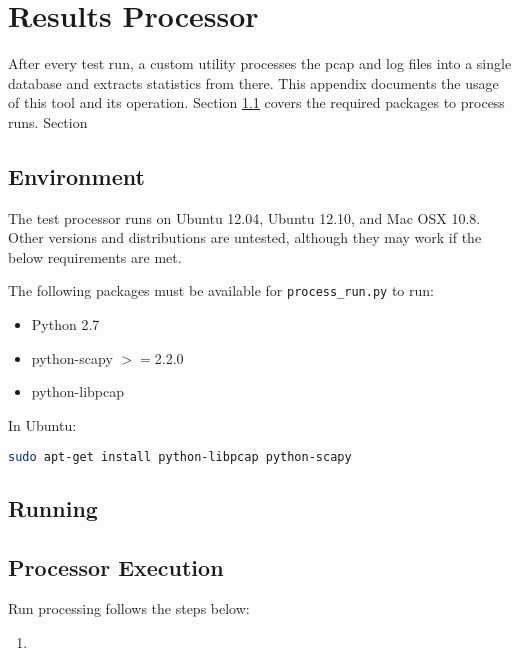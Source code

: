 \chapter{Results Processor}
\label{chp:processor}

\par After every test run, a custom utility processes the pcap and log files into a single database and extracts statistics from there. This appendix documents the usage of this tool and its operation. Section \ref{sec:proc_env} covers the required packages to process runs. Section 

\section{Environment}
\label{sec:proc_env}
\par The test processor runs on Ubuntu 12.04, Ubuntu 12.10, and Mac OSX 10.8. Other versions and distributions are untested, although they may work if the below requirements are met. 

\par The following packages must be available for \texttt{process\_run.py} to run:
{\singlespace
\begin{itemize}
\item Python 2.7
\item python-scapy $>=$2.2.0
\item python-libpcap
\end{itemize}
}

\par In Ubuntu:
\begin{lstlisting}[language=bash]
sudo apt-get install python-libpcap python-scapy
\end{lstlisting}

\section{Running}

\section{Processor Execution}
\par Run processing follows the steps below:
\begin{enumerate}
\item {}
\end{enumerate}

